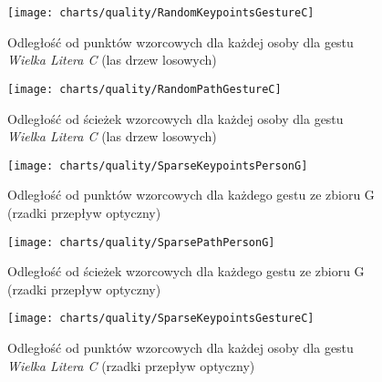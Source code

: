     \newpage
      \begin{figure}[!ht]
        \centering
        \texttt{[image: charts/quality/RandomKeypointsGestureC]}
        \caption[Odległość od punktów wzorcowych dla każdej osoby dla gestu C (las drzew losowych)]
                {Odległość od punktów wzorcowych dla każdej osoby dla gestu\\
                 \textit{Wielka Litera C} (las drzew losowych)}
        \label{fig:RandomKeypointsGestureC}
      \end{figure}

      \begin{figure}[!ht]
        \centering
        \texttt{[image: charts/quality/RandomPathGestureC]}
        \caption[Odległość od ścieżek wzorcowych dla każdej osoby dla gestu C (las drzew losowych)]
                {Odległość od ścieżek wzorcowych dla każdej osoby dla gestu\\
                 \textit{Wielka Litera C} (las drzew losowych)}
        \label{fig:RandomPathGestureC}
      \end{figure}

    \newpage
      \begin{figure}[!ht]
        \centering
        \texttt{[image: charts/quality/SparseKeypointsPersonG]}
        \caption[Odległość od punktów wzorcowych dla każdego gestu (rzadki przepływ optyczny)]
                {Odległość od punktów wzorcowych dla każdego gestu ze zbioru G\\(rzadki przepływ optyczny)}
        \label{fig:SparseKeypointsPersonG}
      \end{figure}

      \begin{figure}[!ht]
        \centering
        \texttt{[image: charts/quality/SparsePathPersonG]}
        \caption[Odległość od ścieżek wzorcowych dla każdego gestu (rzadki przepływ optyczny)]
                {Odległość od ścieżek wzorcowych dla każdego gestu ze zbioru G\\(rzadki przepływ optyczny)}
        \label{fig:SparsePathPersonG}
      \end{figure}

    \newpage
      \begin{figure}[!ht]
        \centering
        \texttt{[image: charts/quality/SparseKeypointsGestureC]}
        \caption[Odległość od punktów wzorcowych dla każdej osoby dla gestu C (rzadki przepływ optyczny)]
                {Odległość od punktów wzorcowych dla każdej osoby dla gestu\\\textit{Wielka Litera C} (rzadki przepływ optyczny)}
        \label{fig:SparseKeypointsGestureC}
      \end{figure}

